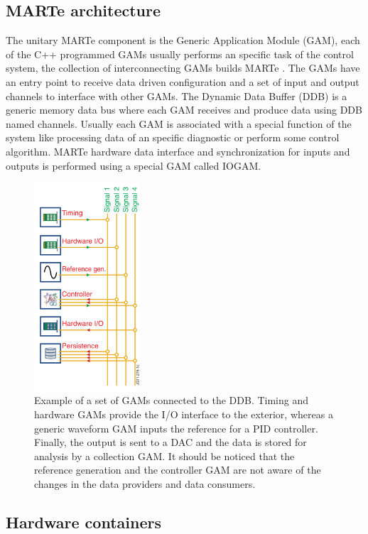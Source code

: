\subsection{MARTe architecture }
The unitary MARTe component is the Generic Application Module (GAM), each of the C++ programmed GAMs usually performs an specific task of the control system, the collection of interconnecting GAMs builds MARTe  \cite{Neto2011}. The GAMs  have an entry point to receive data driven configuration and a set of input and output channels to interface with other GAMs. The Dynamic Data Buffer (DDB) is a generic memory data bus where each GAM receives and produce data using DDB named channels. Usually each GAM is associated with a special function of the system like processing data of an specific diagnostic or perform some  control algorithm. MARTe hardware data interface and synchronization for inputs and outputs is performed using a special GAM called IOGAM.


\begin{figure}[htbp]
	\centering
	\includegraphics[width=0.35\textwidth]{Chp2/GAMs.png}
	\caption{\label{GAMs} Example of a set of GAMs connected to the DDB. Timing and hardware GAMs provide the I/O interface to the exterior, whereas a generic waveform GAM inputs the reference for a PID controller. Finally, the output is sent to a DAC and the data is stored for analysis by a collection GAM.  It should be noticed that the reference generation and the controller GAM are not aware of the changes in the data providers and data consumers.  \cite{MARTe2011}}
	
\end{figure}

\subsection{Hardware containers}

